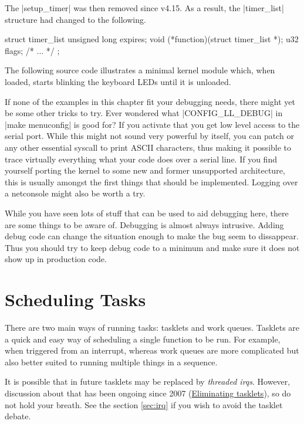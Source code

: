 \documentclass[10pt, oneside]{book}
\begin{document}
The \cpp|setup_timer| was then removed since v4.15.
As a result, the \cpp|timer_list| structure had changed to the following.
\begin{code}
struct timer_list {
    unsigned long expires;
    void (*function)(struct timer_list *);
    u32 flags;
    /* ... */
};
\end{code}

The following source code illustrates a minimal kernel module which, when loaded, starts blinking the keyboard LEDs until it is unloaded.


If none of the examples in this chapter fit your debugging needs, there might yet be some other tricks to try.
Ever wondered what \cpp|CONFIG_LL_DEBUG| in \sh|make menuconfig| is good for?
If you activate that you get low level access to the serial port.
While this might not sound very powerful by itself, you can patch  or any other essential syscall to print ASCII characters, thus making it possible to trace virtually everything what your code does over a serial line.
If you find yourself porting the kernel to some new and former unsupported architecture, this is usually amongst the first things that should be implemented.
Logging over a netconsole might also be worth a try.

While you have seen lots of stuff that can be used to aid debugging here, there are some things to be aware of. Debugging is almost always intrusive.
Adding debug code can change the situation enough to make the bug seem to dissappear.
Thus you should try to keep debug code to a minimum and make sure it does not show up in production code.

\section{Scheduling Tasks}
\label{sec:scheduling_tasks}
There are two main ways of running tasks: tasklets and work queues.
Tasklets are a quick and easy way of scheduling a single function to be run.
For example, when triggered from an interrupt, whereas work queues are more complicated but also better suited to running multiple things in a sequence.

It is possible that in future tasklets may be replaced by \textit{threaded irqs}.
However, discussion about that has been ongoing since 2007 (\href{https://lwn.net/Articles/239633}{Eliminating tasklets}), so do not hold your breath.
See the section \ref{sec:irq} if you wish to avoid the tasklet debate.
\end{document}

